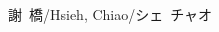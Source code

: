 \documentclass[letterpaper, UTF8]{scrartcl}
\newcommand{\MarginText}[1]{\marginpar{\raggedleft\itshape\small#1}} %
\newcommand{\Description}[1]{\hangindent=0em\hangafter=0\noindent\raggedright\footnotesize{#1}\par\normalsize\vspace{0.3em}}
\newcommand{\reducesep}{\vspace{-0.3em}}
\begin{document}
\begin{CJK}{UTF8}{kai}
\begin{cv}{謝~橋/Hsieh, Chiao/シェ~チャオ}
\begin{comment}
\Description{\MarginText{Presentations}2021 $\cdot$ 15 min. presentation for SkyTrakx at ITSC~2021}

\reducesep

\Description{2020, 2021 $\cdot$ 20 min. presentation for Koord at OOPSLA~2020 and SPLASH~2021}

\reducesep

\Description{2019 $\cdot$ 30 min. presentation for Dione at iFM~2019}

\reducesep

\Description{2015 $\cdot$ 5 min. tool paper presentation at TACAS~2015}

\reducesep

\Description{2014 $\cdot$ 20 min. research paper presentation at SAS 2014}




\newlength{\langbox} %
\settowidth{\langbox}{English} %

\Description{\MarginText{Languages}\parbox{\langbox}{\textsc{Chinese}} $\cdot$ Mother tongue}

\reducesep

\Description{\parbox{\langbox}{\textsc{English}} $\cdot$ Professionally Fluent}

\reducesep

\Description{\parbox{\langbox}{\textsc{Japanese}} $\cdot$ Basic (can read news passages)}
\end{comment}

\end{cv}
\end{CJK}
\end{document}
